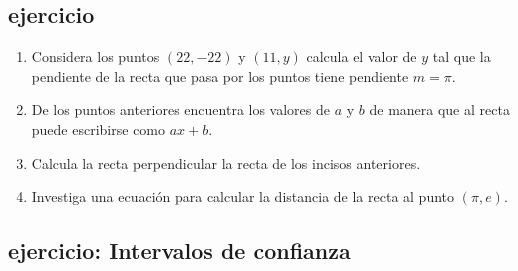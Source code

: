 \documentclass{assignment}
\begin{document}
\subsection{ejercicio}
\begin{enumerate}
	\item Considera los puntos $(22,-22)$ y $(11,y)$ calcula el valor de $y$ tal que la pendiente de la recta que pasa por los puntos tiene pendiente $m=\pi.$
	\item De los puntos anteriores encuentra los valores de $a$ y $b$ de manera que al recta puede escribirse como $ax+b.$ 
	\item Calcula la recta perpendicular la recta de los incisos anteriores. 
	\item Investiga una ecuación para calcular la distancia de la recta al punto $(\pi,e).$
\end{enumerate}

\subsection{ejercicio: Intervalos de confianza}
\end{document}
